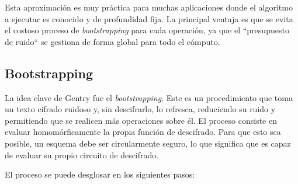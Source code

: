 Esta aproximación es muy práctica para muchas aplicaciones donde el algoritmo a ejecutar es conocido y de profundidad fija. La principal ventaja es que se evita el costoso proceso de \textit{bootstrapping} para cada operación, ya que el ``presupuesto de ruido`` se gestiona de forma global para todo el cómputo.

\subsection{Bootstrapping}

La idea clave de Gentry fue el \textit{bootstrapping}. Este es un procedimiento que toma un texto cifrado ruidoso y, sin descifrarlo, lo refresca, reduciendo su ruido y permitiendo que se realicen más operaciones sobre él. El proceso consiste en evaluar homomórficamente la propia función de descifrado. Para que esto sea posible, un esquema debe ser circularmente seguro, lo que significa que es capaz de evaluar su propio circuito de descifrado.

El proceso se puede desglosar en los siguientes pasos:

